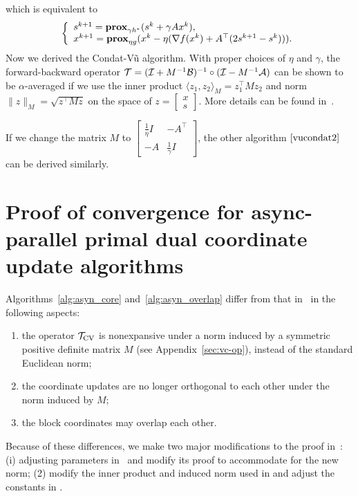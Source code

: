 which is equivalent to
$$\left\{
\begin{array}{l}
s^{k+1}=\prox_{\gamma h^*} (s^k+\gamma Ax^k),\\
x^{k+1}=\prox_{\eta g}(x^k-\eta(\nabla f(x^k)+A^\top(2s^{k+1}-s^k))).
\end{array}
\right.$$
Now we derived the Condat-V\~{u} algorithm. With proper choices of $\eta$ and $\gamma $, the forward-backward operator ${\mathcal{T}}=({\mathcal{I}}+M^{-1}{\mathcal{B}})^{-1}\circ({\mathcal{I}}-M^{-1}{\mathcal{A}})$ can be shown to be $\alpha$-averaged if we use the inner product $\langle z_1,z_2\rangle_M=z_1^\top Mz_2$ and norm $\|z\|_M=\sqrt{z^\top Mz}$ on the space of $z=\begin{bmatrix}x\\ s\end{bmatrix}$. More details can be found in~\cite{davis2014convergence}.

If we change the matrix $M$ to $\begin{bmatrix}
\frac{1}{\eta}I&-A^\top\\
-A&\frac{1}{\gamma}I
\end{bmatrix}$, the other algorithm $\eqref{vucondat2}$ can be derived similarly.
\section{Proof of convergence for async-parallel primal dual coordinate update algorithms}\label{pf:pdasync}
Algorithms~\ref{alg:asyn_core} and~\ref{alg:asyn_overlap} differ from that in~\cite{Peng_2015_AROCK} in the following aspects:
\begin{enumerate}
\item the operator ${{\mathcal{T}}_{\textnormal{CV}}}$ is nonexpansive under a norm induced by a symmetric positive definite matrix $M$ (see Appendix~\ref{sec:vc-op}), instead of the standard Euclidean norm;
\item the coordinate updates are no longer orthogonal to each other under the norm induced by $M$;
\item the block coordinates may overlap each other.
\end{enumerate}
Because of these differences, we make two major modifications to the proof in~\cite[Section 3]{Peng_2015_AROCK}: (i) adjusting parameters in~\cite[Lemma 2]{Peng_2015_AROCK} and modify its proof to accommodate for the new norm; (2) modify the inner product and induced norm used in \cite[Theorem 2]{Peng_2015_AROCK} and adjust the constants in \cite[Theorems 2 and 3]{Peng_2015_AROCK}.

